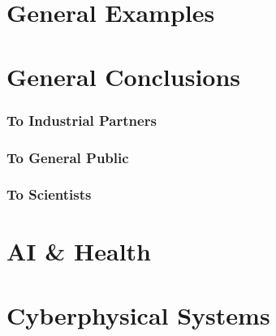 \begin{bibliographysection}
\part{General Examples}

\localized
\localized
\localized
\localized
\localized
\localized
\localized
\localized
\localized

\part{General Conclusions}

\section{To Industrial Partners}
\localized

\section{To General Public}
\localized

\section{To Scientists}
\localized

\part{AI \& Health}

\localized

\part{Cyberphysical Systems}

\localized
\localized
\localized
\localized
\localized


\end{bibliographysection}
